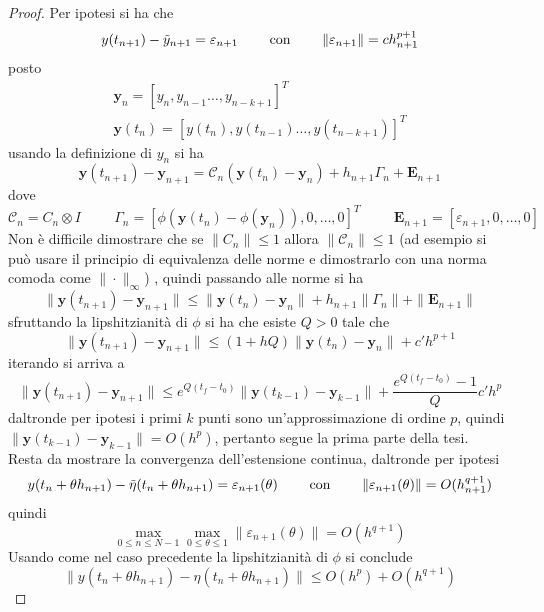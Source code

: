 \begin{proof}
Per ipotesi si ha che
$$
y(t_{n+1}) - \tilde{y}_{n+1} = \varepsilon_{n+1}
\hspace{0.8cm}
\mbox{con}
\hspace{0.8cm}
\| \varepsilon_{n+1} \| = c h_{n+1}^{p+1}
$$
posto 
$$
\begin{array}{lc}
\textbf{y}_n=[y_n , y_{n-1} \dots, y_{n-k+1}]^{T}			\\
\textbf{y}(t_n)=[y(t_n) , y(t_{n-1}) \dots, y(t_{n-k+1})]^{T}
\end{array}
$$
usando la definizione di $y_n$ si ha
$$
 \textbf{y}(t_{n+1}) - \textbf{y}_{n+1} = \mathcal{C}_n 
(\textbf{y}(t_{n}) - \textbf{y}_{n}) + h_{n+1} \Gamma_n + \textbf{E}_{n+1} 
$$
dove 
$$
\mathcal{C}_n = C_n \otimes I	
\hspace{1cm}
\Gamma_n = [\phi(\textbf{y}(t_{n})-\phi(\textbf{y}_{n})), 0 , \dots, 0]^T
\hspace{1cm}
\textbf{E}_{n+1} = [\varepsilon_{n+1}, 0 , \dots , 0]
$$
Non è difficile dimostrare che se $\| C_n \| \le 1$ allora $\| \mathcal{C}_n \| \le 1$ 
(ad esempio si può usare il principio di equivalenza delle norme e dimostrarlo con una norma 
comoda come $\| \cdot \|_{\infty}$)
, quindi passando alle norme si ha
$$
\| \textbf{y}(t_{n+1}) - \textbf{y}_{n+1} \| \le  
\| \textbf{y}(t_{n}) - \textbf{y}_{n} \| + h_{n+1} \| \Gamma_n \| + \| \textbf{E}_{n+1} \| 
$$
sfruttando la lipshitzianità di $\phi$ si ha che esiste $Q > 0$ tale che
$$
\| \textbf{y}(t_{n+1}) - \textbf{y}_{n+1} \| \le  (1+hQ)
\| \textbf{y}(t_{n}) - \textbf{y}_{n} \| + c' h^{p+1}  
$$
iterando si arriva a
$$
\| \textbf{y}(t_{n+1}) - \textbf{y}_{n+1} \| \le e^{Q(t_f - t_0)} 
\| \textbf{y}(t_{k-1}) - \textbf{y}_{k-1} \| + \frac{e^{Q(t_f - t_0)}-1}{Q} c' h^p
$$
daltronde per ipotesi i primi $k$ punti sono un'approssimazione di ordine $p$, quindi 
$\| \textbf{y}(t_{k-1}) - \textbf{y}_{k-1} \|=O(h^p)$, 
pertanto segue la prima parte della tesi. \\[0.3cm]
Resta da mostrare la convergenza dell'estensione continua, daltronde per ipotesi
$$
y(t_n+\theta h_{n+1}) - \tilde{\eta}(t_n + \theta h_{n+1}) = \varepsilon_{n+1}(\theta)
\hspace{0.8cm}
\mbox{con}
\hspace{0.8cm}
\|  \varepsilon_{n+1}(\theta) \| = O(h_{n+1}^{q+1})
$$
quindi
$$
\max_{0 \le n \le N-1}	\max_{0 \le \theta \le 1} \| \varepsilon_{n+1}(\theta) \| = O(h^{q+1})
$$
Usando come nel caso precedente la lipshitzianità di $\phi$ si conclude
$$
\| y(t_n+\theta h_{n+1}) - \eta(t_n + \theta h_{n+1}) \| \le O(h^p) + O(h^{q+1})
$$
\end{proof}

